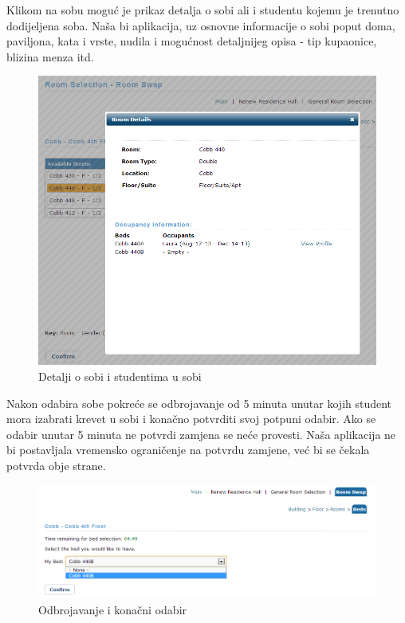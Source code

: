 		Klikom na sobu moguć je prikaz detalja o sobi ali i studentu kojemu je trenutno dodijeljena soba. Naša bi aplikacija, uz osnovne informacije o sobi poput doma, paviljona, kata i vrste, nudila i mogućnost detaljnijeg opisa - tip kupaonice, blizina menza itd. 
		
		\begin{figure}[H]
			\includegraphics[scale=0.4]{slike/rs10.png} %
			\centering
			\caption{Detalji o sobi i studentima u sobi}
			\label{fig:promjene3}
		\end{figure}
	
		Nakon odabira sobe pokreće se odbrojavanje od 5 minuta unutar kojih student mora izabrati krevet u sobi i konačno potvrditi svoj potpuni odabir. Ako se odabir unutar 5 minuta ne potvrdi zamjena se neće provesti. Naša aplikacija ne bi postavljala vremensko ograničenje na potvrdu zamjene, već bi se čekala potvrda obje strane.
		
		\begin{figure}[H]
			\includegraphics[scale=0.5]{slike/rs11.png} %
			\centering
			\caption{Odbrojavanje i konačni odabir}
			\label{fig:promjene4}
		\end{figure}
	
		\clearpage
		
		
		
		\eject
		
	
